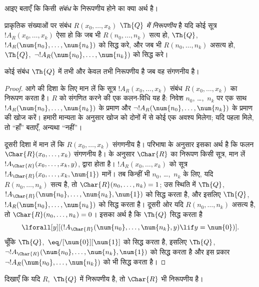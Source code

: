 \documentclass[../../../include/open-logic-section]{subfiles}
\begin{document}


आइए बताएँ कि किसी \emph{संबंध} के निरूपणीय होने का क्या अर्थ है।

\begin{defn}
 प्राकृतिक संख्याओं पर संबंध
$R(x_0,\dots,x_k)$ {\em $\Th{Q}$ में निरूपणीय} है यदि कोई सूत्र
$!A_R(x_0,\dots,x_k)$ ऐसा हो कि जब भी $R(n_0,\dots,n_k)$ सत्य हो,
$\Th{Q}$,~$!A_R(\num{n_0},\dots,\num{n_k})$ को सिद्ध करे, और जब भी
$R(n_0,\dots,n_k)$ असत्य हो, $\Th{Q}$,~$\lnot !A_R(\num{n_0},
\dots, \num{n_k})$ को सिद्ध करे।
\end{defn}

\begin{thm}
 कोई संबंध $\Th{Q}$ में तभी और केवल तभी
निरूपणीय है जब वह संगणनीय है।
\end{thm}

\begin{proof}
आगे की दिशा के लिए मान लें कि सूत्र $!A_R(x_0,\dots,x_k)$ संबंध
$R(x_0,\dots,x_k)$ का निरूपण करता है। $R$ को संगणित करने की एक
कलन-विधि यह है: निवेश $n_0$, \dots,~$n_k$ पर एक साथ
$!A_R(\num{n_0}, \dots, \num{n_k})$ के प्रमाण और
$\lnot !A_R(\num{n_0}, \dots, \num{n_k})$ के प्रमाण की खोज करें। हमारी
मान्यता के अनुसार खोज को दोनों में से कोई एक अवश्य मिलेगा; यदि पहला मिले,
तो ``हाँ'' बताएँ, अन्यथा ``नहीं''।

दूसरी दिशा में मान लें कि $R(x_0, \dots, x_k)$ संगणनीय है। परिभाषा के
अनुसार इसका अर्थ है कि फलन $\Char{R}(x_0, \dots, x_k)$ संगणनीय है।
 के अनुसार $\Char{R}$ का निरूपण
किसी सूत्र, मान लें $!A_{\Char{R}}(x_0, \dots, x_k, y)$, द्वारा होता है।
$!A_R(x_0, \dots, x_k)$ को सूत्र
$!A_{\Char{R}}(x_0, \dots, x_k, \num{1})$ मानें। तब किन्हीं भी
$n_0$, \dots,~$n_k$ के लिए, यदि $R(n_0, \dots, n_k)$ सत्य है, तो
$\Char{R}(n_0, \dots, n_k) = 1$; उस स्थिति में $\Th{Q}$,
$!A_{\Char{R}}(\num{n_0}, \dots, \num{n_k}, \num{1})$ को सिद्ध करता है,
और इसलिए $\Th{Q}$,~$!A_R(\num{n_0}, \dots, \num{n_k})$ को सिद्ध करता है।
दूसरी ओर यदि $R(n_0, \dots, n_k)$ असत्य है, तो
$\Char{R}(n_0, \dots, n_k) = 0$। इसका अर्थ है कि $\Th{Q}$ सिद्ध करता है
\[
\lforall[y][(!A_{\Char{R}}(\num{n_0}, \dots, \num{n_k}, y) \lif y =
  \num{0})].
\]
चूँकि $\Th{Q}$,~$\eq/[\num{0}][\num{1}]$ को सिद्ध करता है, इसलिए
$\Th{Q}$,~$\lnot !A_{\Char{R}}(\num{n_0}, \dots, \num{n_k}, \num{1})$
को सिद्ध करता है और इस प्रकार
$\lnot !A_R(\num{n_0}, \dots, \num{n_k})$ को भी सिद्ध करता है।
\end{proof}

\begin{prob}
दिखाएँ कि यदि $R$,~$\Th{Q}$ में निरूपणीय है, तो $\Char{R}$ भी निरूपणीय है।
\end{prob}
\end{document}

